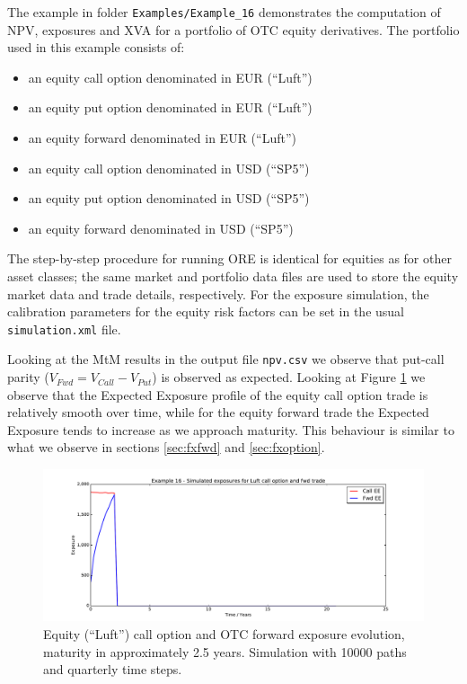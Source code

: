 \documentclass[12pt, a4paper]{article}
\begin{document}
The example in folder {\tt Examples/Example\_16} demonstrates the computation of NPV, exposures and XVA for a portfolio 
of OTC equity derivatives. The portfolio used in this example consists of:

\begin{itemize}
	\item an equity call option denominated in EUR (``Luft'')
	\item an equity put option denominated in EUR (``Luft'')
	\item an equity forward denominated in EUR (``Luft'')
	\item an equity call option denominated in USD (``SP5'')
	\item an equity put option denominated in USD (``SP5'')
	\item an equity forward denominated in USD (``SP5'')
\end{itemize}

The step-by-step procedure for running ORE is identical for equities as for other asset classes; the same market and 
portfolio data files are used to store the equity market data and trade details, respectively. For the exposure 
simulation, the calibration parameters for the equity risk factors can be set in the usual {\tt simulation.xml} file.

Looking at the MtM results in the output file {\tt npv.csv} we observe that put-call parity ($V_{Fwd} = V_{Call} - 
V_{Put}$) is observed as expected. Looking at Figure \ref{fig_eq_call} we observe that the Expected Exposure profile of 
the equity call option trade is relatively smooth over time, while for the equity forward trade the Expected Exposure 
tends to increase as we approach maturity. This behaviour is similar to what we observe in sections \ref{sec:fxfwd} 
and \ref{sec:fxoption}. 

\begin{figure}[h!]
	\begin{center}
		\includegraphics[scale=0.45]{mpl_eq_call.pdf}
	\end{center}
	\caption{Equity (``Luft'') call option and OTC forward exposure evolution, maturity in approximately 2.5 years. 
	Simulation with 
	10000 paths and quarterly time steps.}
	\label{fig_eq_call}
\end{figure}
\end{document}
